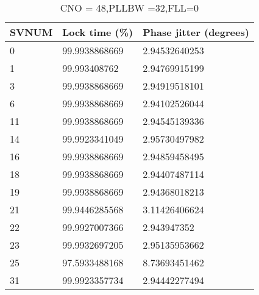 \begin{table}[!htb]
\centering
\begin{tabular}{|l|l|l|}
\hline
\rowcolor[HTML]{C0C0C0} 
SVNUM & Lock time (\%) & Phase jitter (degrees) \\ \hline
0     & 99.9938868669  & 2.94532640253          \\ \hline
\rowcolor[HTML]{EFEFEF} 
1     & 99.993408762   & 2.94769915199          \\ \hline
3     & 99.9938868669  & 2.94919518101          \\ \hline
\rowcolor[HTML]{EFEFEF} 
6     & 99.9938868669  & 2.94102526044          \\ \hline
11    & 99.9938868669  & 2.94545139336          \\ \hline
\rowcolor[HTML]{EFEFEF} 
14    & 99.9923341049  & 2.95730497982          \\ \hline
16    & 99.9938868669  & 2.94859458495          \\ \hline
\rowcolor[HTML]{EFEFEF} 
18    & 99.9938868669  & 2.94407487114          \\ \hline
19    & 99.9938868669  & 2.94368018213          \\ \hline
\rowcolor[HTML]{EFEFEF} 
21    & 99.9446285568  & 3.11426406624          \\ \hline
22    & 99.9927007366  & 2.943947352            \\ \hline
\rowcolor[HTML]{EFEFEF} 
23    & 99.9932697205  & 2.95135953662          \\ \hline
25    & 97.5933488168  & 8.73693451462          \\ \hline
\rowcolor[HTML]{EFEFEF} 
31    & 99.9923357734  & 2.94442277494          \\ \hline
\end{tabular}

\caption{CNO = 48,PLLBW =32,FLL=0}
\label{my-label}
\end{table}


